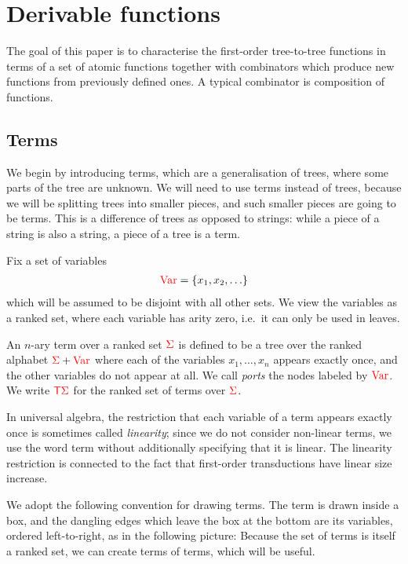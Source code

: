 \section{Derivable functions}
The goal of this paper is to characterise the first-order tree-to-tree functions in terms of a set of  atomic functions together with combinators which produce new functions from previously defined ones. A typical combinator is composition of functions.

\subsection{Terms}
We begin by introducing terms, which are a generalisation of trees, where some parts of the tree are unknown. We will need to use terms instead of trees, because we will be splitting  trees into smaller pieces, and such smaller pieces are going to be terms. This is a difference of trees as opposed to strings: while a piece  of a string is also a string, a piece of a tree is a term.

Fix a set of variables
\begin{align*}
    {{\color{red}{\mathrm{Var}}}} = \{x_1,x_2,\ldots\}
\end{align*}
which will be assumed to be disjoint with all other sets.  We view the variables as a ranked set, where each variable has arity zero, i.e.~it can only be used in leaves. 

\begin{definition}[Terms]\label{def:terms}
    An $n$-ary term over a ranked set ${\color{red}{\Sigma}}$ is defined to be a tree over the ranked alphabet ${\color{red}{\Sigma}} + {{\color{red}{\mathrm{Var}}}}$ where each of the  variables $x_1,\ldots,x_n$ appears exactly once,  and the other variables do not appear at all.  We call \emph{ports} the nodes labeled by ${{\color{red}{\mathrm{Var}}}}$.  We write ${\color{red}{\mathsf T}} {\color{red}{\Sigma}}$ for the ranked set of terms over ${\color{red}{\Sigma}}$.  
\end{definition}

In universal algebra, the restriction that each variable of a term appears exactly once is sometimes called \emph{linearity}; since we do not consider non-linear terms, we use the word term without additionally specifying that it is linear.  The linearity restriction is connected to the fact that first-order transductions have linear size increase.

We adopt the following convention for drawing terms. The term is drawn inside a box, and the dangling edges which leave the box at the bottom are its variables, ordered left-to-right, as in the following picture: 
 Because the set of terms is itself a ranked set,  we can create terms of terms, which will be useful.

